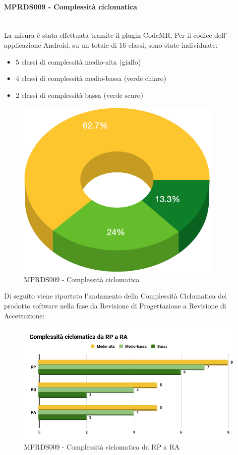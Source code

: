 \paragraph{MPRDS009 - Complessità ciclomatica}\mbox{}\\[0.4cm]
La misura è stata effettuata tramite il plugin CodeMR. Per il codice dell' applicazione Android, su un totale di 16 classi, sono state individuate: \begin{itemize}
	\item 5 classi di complessità medio-alta (giallo)
	\item 4 classi di complessità medio-bassa (verde chiaro)
	\item 2 classi di complessità bassa (verde scuro)
\end{itemize}
\begin{figure}[H]
	\centering
	\includegraphics[width=10cm,keepaspectratio]{../includes/pics/complexRA.png}
	\caption{\label{fig:mission}MPRDS009 - Complessità ciclomatica}
\end{figure}
Di seguito viene riportato l'andamento della Complessità Ciclomatica del prodotto software nella fase da Revisione di Progettazione a Revisione di Accettazione:
\begin{figure}[H]
	\centering
	\includegraphics[width=13cm,keepaspectratio]{../includes/pics/complexCiclo.png}
	\caption{\label{fig:mission}MPRDS009 - Complessità ciclomatica da RP a RA}
\end{figure}
